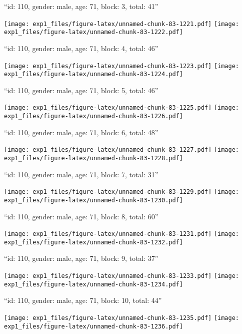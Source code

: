 \documentclass[11pt,,]{article}
\begin{document}
\newpage
[1] 

``id: 110, gender: male, age: 71, block: 3, total: 41''

\texttt{[image: exp1\_files/figure-latex/unnamed-chunk-83-1221.pdf]}
\texttt{[image: exp1\_files/figure-latex/unnamed-chunk-83-1222.pdf]}

\newpage
[1] 

``id: 110, gender: male, age: 71, block: 4, total: 46''

\texttt{[image: exp1\_files/figure-latex/unnamed-chunk-83-1223.pdf]}
\texttt{[image: exp1\_files/figure-latex/unnamed-chunk-83-1224.pdf]}

\newpage
[1] 

``id: 110, gender: male, age: 71, block: 5, total: 46''

\texttt{[image: exp1\_files/figure-latex/unnamed-chunk-83-1225.pdf]}
\texttt{[image: exp1\_files/figure-latex/unnamed-chunk-83-1226.pdf]}

\newpage
[1] 

``id: 110, gender: male, age: 71, block: 6, total: 48''

\texttt{[image: exp1\_files/figure-latex/unnamed-chunk-83-1227.pdf]}
\texttt{[image: exp1\_files/figure-latex/unnamed-chunk-83-1228.pdf]}

\newpage
[1] 

``id: 110, gender: male, age: 71, block: 7, total: 31''

\texttt{[image: exp1\_files/figure-latex/unnamed-chunk-83-1229.pdf]}
\texttt{[image: exp1\_files/figure-latex/unnamed-chunk-83-1230.pdf]}

\newpage
[1] 

``id: 110, gender: male, age: 71, block: 8, total: 60''

\texttt{[image: exp1\_files/figure-latex/unnamed-chunk-83-1231.pdf]}
\texttt{[image: exp1\_files/figure-latex/unnamed-chunk-83-1232.pdf]}

\newpage
[1] 

``id: 110, gender: male, age: 71, block: 9, total: 37''

\texttt{[image: exp1\_files/figure-latex/unnamed-chunk-83-1233.pdf]}
\texttt{[image: exp1\_files/figure-latex/unnamed-chunk-83-1234.pdf]}

\newpage
[1] 

``id: 110, gender: male, age: 71, block: 10, total: 44''

\texttt{[image: exp1\_files/figure-latex/unnamed-chunk-83-1235.pdf]}
\texttt{[image: exp1\_files/figure-latex/unnamed-chunk-83-1236.pdf]}
\end{document}
